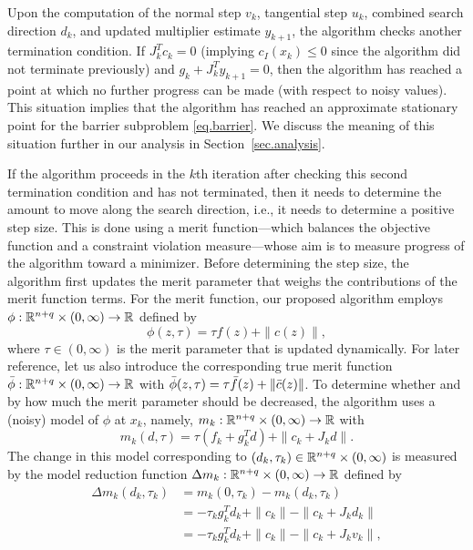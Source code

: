 Upon the computation of the normal step $v_k$, tangential step $u_k$, combined search direction $d_k$, and updated multiplier estimate $y_{k+1}$, the algorithm checks another termination condition.  If $J_k^Tc_k = 0$ (implying $c_I(x_k) \leq 0$ since the algorithm did not terminate previously) and $g_k + J_k^Ty_{k+1} = 0$, then the algorithm has reached a point at which no further progress can be made (with respect to noisy values).  This situation implies that the algorithm has reached an approximate stationary point for the barrier subproblem \eqref{eq.barrier}.  We discuss the meaning of this situation further in our analysis in Section~\ref{sec.analysis}.

If the algorithm proceeds in the $k$th iteration after checking this second termination condition and has not terminated, then it needs to determine the amount to move along the search direction, i.e., it needs to determine a positive step size.  This is done using a merit function---which balances the objective function and a constraint violation measure---whose aim is to measure progress of the algorithm toward a minimizer.  Before determining the step size, the algorithm first updates the merit parameter that weighs the contributions of the merit function terms.  For the merit function, our proposed algorithm employs $\phi : \mathbb{R}^{n+q} \times (0,\infty) \to \mathbb{R}$ defined by
\begin{equation*}
  \phi(z,\tau) = \tau f(z) + \| c(z) \|,
\end{equation*}
where $\tau \in (0,\infty)$ is the merit parameter that is updated dynamically.  For later reference, let us also introduce the corresponding true merit function ${\bar \phi} : \mathbb{R}^{n+q} \times (0,\infty) \to \mathbb{R}$ with ${\bar \phi}(z,\tau) = \tau {\bar f}(z) + \|{\bar c}(z)\|$.  To determine whether and by how much the merit parameter should be decreased, the algorithm uses a (noisy) model of $\phi$ at $x_k$, namely, $m_k : \mathbb{R}^{n+q} \times (0,\infty) \to \mathbb{R}$ with
\begin{equation*}
  m_k(d,\tau) = \tau (f_k + g_k^T d) + \|c_k + J_kd\|.
\end{equation*}
The change in this model corresponding to $(d_k,\tau_k) \in \mathbb{R}^{n+q} \times (0,\infty)$ is measured by the model reduction function $\Delta m_k : \mathbb{R}^{n+q} \times (0,\infty) \to \mathbb{R}$ defined by
\begin{align}
   \Delta m_k(d_k, \tau_k) &= m_k(0,\tau_k) - m_k(d_k,\tau_k) \nonumber \\ 
   &= -\tau_k g_k^T d_k + \|c_k\| - \|c_k + J_k d_k\| \nonumber \\
   &= -\tau_k g_k^T d_k + \|c_k\| - \|c_k + J_k v_k\|, \label{eq.delta_m_tilde}
\end{align}
